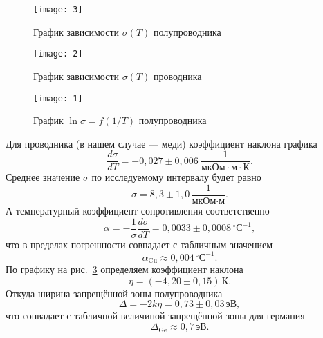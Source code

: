 \documentclass[a4paper]{article}
\begin{document}
\begin{figure}[htpb]
	\centering
	\texttt{[image: 3]}
	\caption{График зависимости $\sigma(T)$ полупроводника}
	\label{fig:1}
\end{figure}
\begin{figure}[htpb]
	\centering
	\texttt{[image: 2]}
	\caption{График зависимости $\sigma(T)$ проводника}
	\label{fig:2}
\end{figure}
\begin{figure}[htpb]
	\centering
	\texttt{[image: 1]}
	\caption{График $\ln \sigma =f(1 /T)$ полупроводника}
	\label{fig:3}
\end{figure}
Для проводника (в нашем случае --- меди) коэффициент наклона графика 
\[
\frac{d\sigma}{dT}=-0,027\pm 0,006\ \frac{1}{\text{мкОм}\cdot \text{м}
\cdot \text{К}}
.\] 
Среднее значение $\sigma$ по исследуемому интервалу будет равно
\[\overline{\sigma}=8,3\pm 1,0\, \frac{1}{\text{мкОм}\cdot \text{м}}.\]
А температурный коэффициент сопротивления соответственно
\[
\alpha=- \frac{1}{\overline{\sigma}} \frac{d\sigma}{dT}=
0,0033\pm 0,0008 \, ^\circ \text{С} ^{-1}
 ,\] 
что в пределах погрешности совпадает с табличным значением
\[
\alpha_\text{Cu}\approx 0,004 \, ^\circ \text{С} ^{-1}
.\] 
По графику на рис.~\ref{fig:3} определяем коэффициент наклона
\[
	\eta=(-4,20\pm 0,15)\, \text{К}
.\] 
Откуда ширина запрещённой зоны полупроводника
\[
\Delta= -2k \eta =0,73\pm 0,03\, \text{эВ}
,\] 
что сопвадает с табличной величиной запрещённой зоны для германия
\[
\Delta_\text{Ge}\approx 0,7\,\text{эВ}
.\] 
\end{document}
